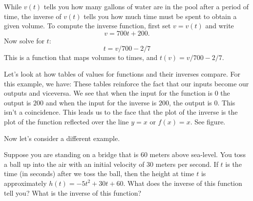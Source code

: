 \documentclass{ximera}
\begin{document}
\begin{solution}
While $v(t)$ tells you how many gallons of water are in the pool after
a period of time, the inverse of $v(t)$ tells you how much time must
be spent to obtain a given volume. To compute the inverse function,
first set $v=v(t)$ and write
\[
v = 700t + 200.
\]
Now solve for $t$:
\[
t = v/700 - 2/7
\]
This is a function that maps volumes to times, and 
$t(v) = v/700-2/7$.

Let's look at how tables of values for functions and their inverses compare.  For this example, we have: 
These tables reinforce the fact that our inputs become our outputs and viceversa.  We see that when the input for the function is $0$ the output is $200$ and when the input for the inverse is $200$, the output is $0$.  This isn't a coincidence.  This leads us to the face that the plot of the inverse is the plot of the function reflected over the line $y=x$ or $f(x)=x$.  See figure.
\end{solution}


Now let's consider a different example.

\begin{example}\label{E:example-ball-bridge}
Suppose you are standing on a bridge that is 60 meters above
sea-level. You toss a ball up into the air with an initial velocity of
30 meters per second.  If $t$ is the time (in seconds) after we toss
the ball, then the height at time $t$ is approximately $h(t) = -5 t^2
+30t+60$. What does the inverse of this function tell you? What is the inverse
of this function?
\end{example}
\end{document}
